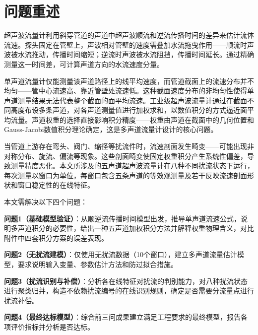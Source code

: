 \section{问题重述}

超声波流量计利用斜穿管道的声道中超声波顺流和逆流传播时间的差异来估计流体流速。探头固定在管壁上，声波相对管壁的速度需叠加水流拖曳作用——顺流时声波被水流推动，传播时间缩短；逆流时声波被水流阻挡，传播时间延长。通过精确测量这一时间差，可计算声道方向的水流速度分量。

单声道流量计仅能测量该声道路径上的线平均速度，而管道截面上的流速分布并不均匀——管中心流速高、靠近管壁处流速低。这种截面速度分布的非均匀性使得单声道测量结果无法代表整个截面的面平均流速。工业级超声波流量计通过在截面不同高度布设多条声道，对各声道测量值进行加权求和，以数值积分的方式逼近面平均流量。声道权重的选择直接影响积分精度——权重由声道在截面中的几何位置和Gauss-Jacobi数值积分理论确定，这是多声道流量计设计的核心问题。

当管道上游存在弯头、阀门、缩径等扰流件时，流速剖面发生畸变——可能出现非对称分布、旋流、偏流等现象。这些剖面畸变使固定权重积分产生系统性偏差，导致测量精度恶化。本文所涉及的五声道超声波流量计在八种不同扰流状态下运行，每次测量以窗口为单位，每窗口包含五条声道的等效观测量及若干反映流速剖面形状和窗口稳定性的在线特征。

本文需解决以下四个问题：

\textbf{问题1（基础模型验证）}：从顺逆流传播时间模型出发，推导单声道流速公式，说明多声道积分的必要性，给出一种五声道加权积分方法并解释权重物理含义，对比附件中四套积分方案的误差表现。

\textbf{问题2（无扰流建模）}：仅使用无扰流数据（10个窗口），建立多声道流量估计模型，要求说明输入变量、参数估计方法和防过拟合措施。

\textbf{问题3（扰流识别与补偿）}：分析各在线特征对扰流的判别能力，对八种扰流状态进行聚类归并，构造不依赖扰流编号的在线识别规则，确定是否需要分流量点进行扰流补偿。

\textbf{问题4（最终达标模型）}：综合前三问成果建立满足工程要求的最终模型，报告各项评价指标并分析是否达标。
